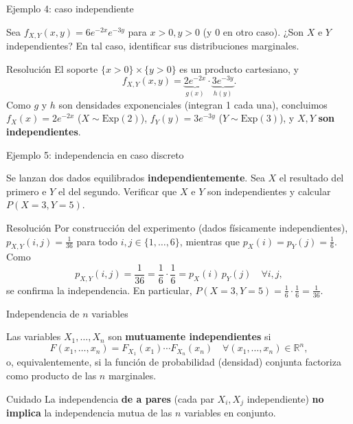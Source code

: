 \documentclass[aspectratio=169,11pt]{beamer}
\begin{document}
\begin{frame}{Ejemplo 4: caso independiente}
\begin{example}
Sea $f_{X,Y}(x,y) = 6e^{-2x}e^{-3y}$ para $x>0, y>0$ (y $0$ en otro caso). ¿Son $X$ e $Y$ independientes? En tal caso, identificar sus distribuciones marginales.
\end{example}
\pause
\begin{block}{Resolución}
El soporte $\{x>0\}\times\{y>0\}$ es un producto cartesiano, y
\[
f_{X,Y}(x,y) = \underbrace{2e^{-2x}}_{g(x)} \cdot \underbrace{3e^{-3y}}_{h(y)}.
\]
Como $g$ y $h$ son densidades exponenciales (integran 1 cada una), concluimos $f_X(x)=2e^{-2x}$ ($X\sim \text{Exp}(2)$), $f_Y(y)=3e^{-3y}$ ($Y\sim\text{Exp}(3)$), y $X,Y$ \textbf{son independientes}.
\end{block}
\end{frame}

\begin{frame}{Ejemplo 5: independencia en caso discreto}
\begin{example}
Se lanzan dos dados equilibrados \textbf{independientemente}. Sea $X$ el resultado del primero e $Y$ el del segundo. Verificar que $X$ e $Y$ son independientes y calcular $P(X=3,Y=5)$.
\end{example}
\pause
\begin{block}{Resolución}
Por construcción del experimento (dados físicamente independientes), $p_{X,Y}(i,j) = \tfrac{1}{36}$ para todo $i,j\in\{1,\ldots,6\}$, mientras que $p_X(i)=p_Y(j)=\tfrac16$. Como
\[
p_{X,Y}(i,j) = \frac{1}{36} = \frac16\cdot\frac16 = p_X(i)\,p_Y(j) \quad \forall i,j,
\]
se confirma la independencia. En particular, $P(X=3,Y=5) = \tfrac16\cdot\tfrac16 = \tfrac{1}{36}$.
\end{block}
\end{frame}

\begin{frame}{Independencia de $n$ variables}
\begin{definition}
Las variables $X_1,\ldots,X_n$ son \textbf{mutuamente independientes} si
\[
F(x_1,\ldots,x_n) = F_{X_1}(x_1)\cdots F_{X_n}(x_n) \quad \forall (x_1,\ldots,x_n)\in\mathbb{R}^n,
\]
o, equivalentemente, si la función de probabilidad (densidad) conjunta factoriza como producto de las $n$ marginales.
\end{definition}
\begin{alertblock}{Cuidado}
La independencia \textbf{de a pares} (cada par $X_i,X_j$ independiente) \textbf{no implica} la independencia mutua de las $n$ variables en conjunto.
\end{alertblock}
\end{frame}
\end{document}
